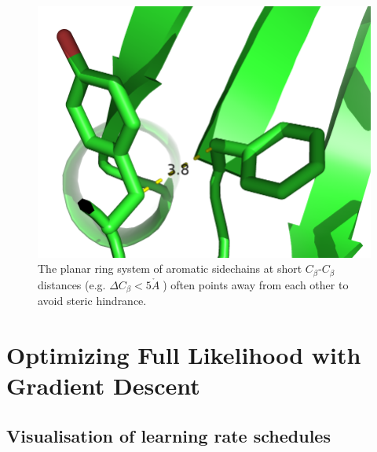 \documentclass[11pt,a4paper,twoside]{book}
\newcommand{\Cb}{C_\beta}
\newcommand{\angstrom}{\mathring{A} \;}
\theoremstyle{definition}
\theoremstyle{definition}
\theoremstyle{remark}
\begin{document}
\begin{figure}
\includegraphics[width=0.5\linewidth]{img/coupling_matrix_analysis/aromatic_residues_short_distance} \caption{The planar ring
system of aromatic sidechains at short \(\Cb\)-\(\Cb\) distances (e.g.
\(\Delta \Cb < 5 \angstrom\)) often points away from each other to avoid
steric hindrance.}\label{fig:aromatic-residues-at-short-distances}
\end{figure}

\chapter{Optimizing Full Likelihood with Gradient
Descent}\label{optimizing-full-likelihood-with-gradient-descent}

\section{Visualisation of learning rate
schedules}\label{visualisation-of-learning-rate-schedules}
\end{document}
